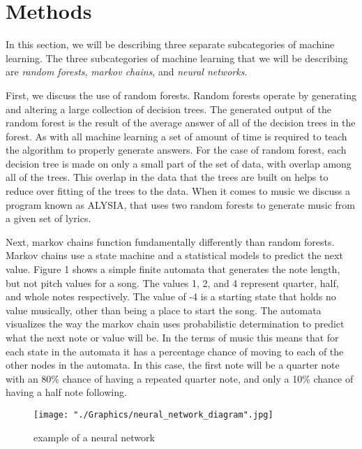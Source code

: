 \documentclass{sig-alternate}
\begin{document}
\section{Methods}
\label{sec:methods}

	In this section, we will be describing three separate subcategories of machine learning. The three subcategories of machine learning that we will be describing are \textit{random forests},\textit{ markov chains}, and \textit{neural networks}.


	First, we discuss the use of random forests. Random forests operate by generating and altering a large collection of decision trees. The generated output of the random forest is the result of the average answer of all of the decision trees in the forest. As with all machine learning a set of amount of time is required to teach the algorithm to properly generate answers. For the case of random forest, each decision tree is made on only a small part of the set of data, with overlap among all of the trees. This overlap in the data that the trees are built on helps to reduce over fitting of the trees to the data. When it comes to music we discuss a program known as ALYSIA, that uses two random forests to generate music from a given set of lyrics.

	Next, markov chains function fundamentally differently than random forests. Markov chains use a state machine and a statistical models to predict the next value. Figure 1 shows a simple finite automata that generates the note length, but not pitch values for a song. The values 1, 2, and 4 represent quarter, half, and whole notes respectively. The value of -4 is a starting state that holds no value musically, other than being a place to start the song. The automata visualizes the way the markov chain uses probabilistic determination to predict what the next note or value will be. In the terms of music this means that for each state in the automata it has a percentage chance of moving to each of the other nodes in the automata. In this case, the first note will be a quarter note with an 80\% chance of having a repeated quarter note, and only a 10\% chance of having a half note following.


\begin{figure}[H]
	\texttt{[image: "./Graphics/neural\_network\_diagram".jpg]}
	\caption{example of a neural network}
	\label{fig:neuralnetexample}
\end{figure}
	
\end{document}
